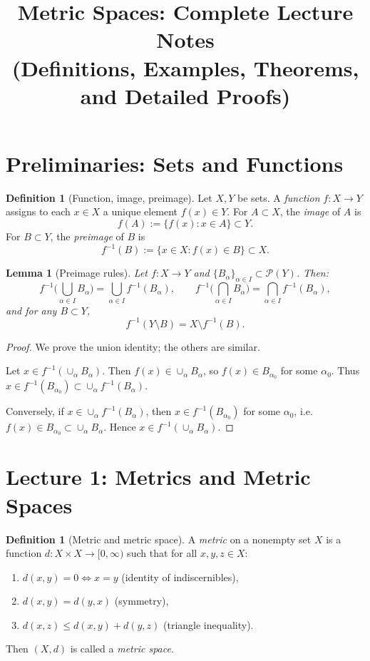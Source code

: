 \documentclass[11pt]{article}
\title{Metric Spaces: Complete Lecture Notes\\
(Definitions, Examples, Theorems, and Detailed Proofs)}
\author{}
\date{}
\newtheorem{lemma}[theorem]{Lemma}
\theoremstyle{definition}
\newtheorem{definition}[theorem]{Definition}
\begin{document}
\maketitle
\tableofcontents

\section{Preliminaries: Sets and Functions}

\begin{definition}[Function, image, preimage]
Let $X,Y$ be sets. A \emph{function} $f:X\to Y$ assigns to each $x\in X$ a unique element $f(x)\in Y$.
For $A\subset X$, the \emph{image} of $A$ is
\[
f(A):=\{f(x):x\in A\}\subset Y.
\]
For $B\subset Y$, the \emph{preimage} of $B$ is
\[
f^{-1}(B):=\{x\in X: f(x)\in B\}\subset X.
\]
\end{definition}

\begin{lemma}[Preimage rules]
Let $f:X\to Y$ and $\{B_\alpha\}_{\alpha\in I}\subset \mathcal P(Y)$. Then:
\[
f^{-1}\!\Big(\bigcup_{\alpha\in I} B_\alpha\Big)=\bigcup_{\alpha\in I} f^{-1}(B_\alpha),\qquad
f^{-1}\!\Big(\bigcap_{\alpha\in I} B_\alpha\Big)=\bigcap_{\alpha\in I} f^{-1}(B_\alpha),
\]
and for any $B\subset Y$,
\[
f^{-1}(Y\setminus B)=X\setminus f^{-1}(B).
\]
\end{lemma}

\begin{proof}
We prove the union identity; the others are similar.

Let $x\in f^{-1}(\cup_\alpha B_\alpha)$. Then $f(x)\in\cup_\alpha B_\alpha$, so $f(x)\in B_{\alpha_0}$ for some $\alpha_0$.
Thus $x\in f^{-1}(B_{\alpha_0})\subset \cup_\alpha f^{-1}(B_\alpha)$.

Conversely, if $x\in \cup_\alpha f^{-1}(B_\alpha)$, then $x\in f^{-1}(B_{\alpha_0})$ for some $\alpha_0$, i.e. $f(x)\in B_{\alpha_0}\subset\cup_\alpha B_\alpha$.
Hence $x\in f^{-1}(\cup_\alpha B_\alpha)$.
\end{proof}

\section{Lecture 1: Metrics and Metric Spaces}

\begin{definition}[Metric and metric space]
A \emph{metric} on a nonempty set $X$ is a function $d:X\times X\to[0,\infty)$ such that for all $x,y,z\in X$:
\begin{enumerate}[label=\textbf{(M\arabic*)}]
\item $d(x,y)=0 \iff x=y$ \quad (identity of indiscernibles),
\item $d(x,y)=d(y,x)$ \quad (symmetry),
\item $d(x,z)\le d(x,y)+d(y,z)$ \quad (triangle inequality).
\end{enumerate}
Then $(X,d)$ is called a \emph{metric space}.
\end{definition}
\end{document}
